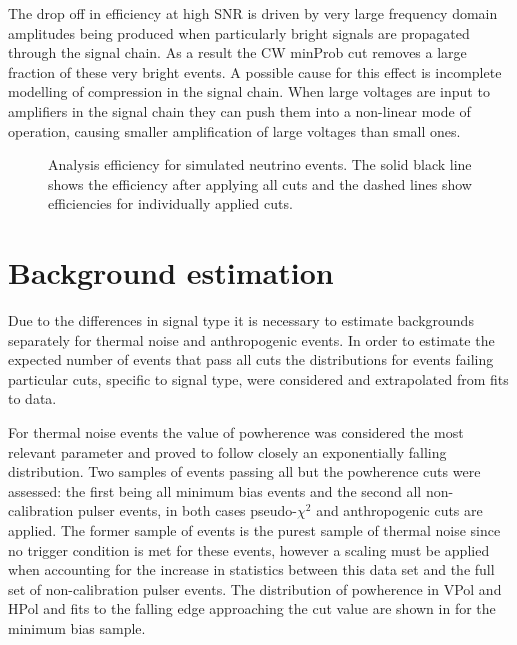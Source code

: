 The drop off in efficiency at high SNR is driven by very large frequency domain amplitudes being produced when particularly bright signals are propagated through the signal chain. As a result the CW minProb cut removes a large fraction of these very bright events. A possible cause for this effect is incomplete modelling of compression in the signal chain. When large voltages are input to amplifiers in the signal chain they can push them into a non-linear mode of operation, causing smaller amplification of large voltages than small ones. 


\begin{figure}[htpb]
\hfill
{}
\caption{Analysis efficiency for simulated neutrino events. The solid black line shows the efficiency after applying all cuts and the dashed lines show efficiencies for individually applied cuts.}
\label{fig:Analysis:Cut-Results:Efficiency}
\end{figure}


\section{Background estimation}
\label{sec:Analysis:Background-Estimation}

Due to the differences in signal type it is necessary to estimate backgrounds separately for thermal noise and anthropogenic events. In order to estimate the expected number of events that pass all cuts the distributions for events failing particular cuts, specific to signal type, were considered and extrapolated from fits to data.

For thermal noise events the value of powherence was considered the most relevant parameter and proved to follow closely an exponentially falling distribution. Two samples of events passing all but the powherence cuts were assessed: the first being all minimum bias events and the second all non-calibration pulser events, in both cases pseudo-$\chi^{2}$ and anthropogenic cuts are applied. The former sample of events is the purest sample of thermal noise since no trigger condition is met for these events, however a scaling must be applied when accounting for the increase in statistics between this data set and the full set of non-calibration pulser events. The distribution of powherence in VPol and HPol and fits to the falling edge approaching the cut value are shown in  for the minimum bias sample. 

